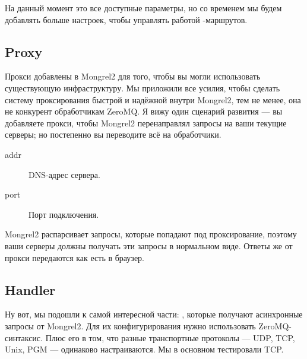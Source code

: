 На данный момент это все доступные параметры, но со временем мы будем
добавлять больше настроек, чтобы управлять работой
-маршрутов.

\subsection{Proxy}

Прокси добавлены в Mongrel2 для того, чтобы вы могли использовать
существующую инфраструктуру. Мы приложили все усилия, чтобы сделать
систему проксирования быстрой и надёжной внутри Mongrel2, тем не
менее, она не конкурент обработчикам ZeroMQ. Я вижу один сценарий
развития --- вы добавляете прокси, чтобы Mongrel2 перенаправлял
запросы на ваши текущие серверы; но постепенно вы переводите всё на
обработчики.

\begin{description}
\item[addr] DNS-адрес сервера.
\item[port] Порт подключения.
\end{description}

Mongrel2 распарсивает запросы, которые попадают под проксирование,
поэтому ваши серверы должны получать эти запросы в нормальном виде.
Ответы же от прокси передаются как есть в браузер.

\subsection{Handler}

Ну вот, мы подошли к самой интересной части:
, которые получают асинхронные запросы от
Mongrel2. Для их конфигурирования нужно использовать ZeroMQ-синтаксис.
Плюс его в том, что разные транспортные протоколы --- UDP, TCP, Unix,
PGM --- одинаково настраиваются. Мы в основном тестировали TCP.

